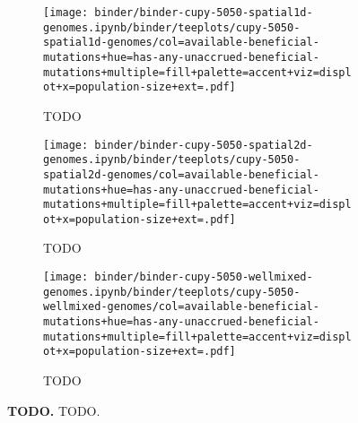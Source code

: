 \begin{figure}[h]
    \begin{subfigure}[b]{\linewidth}
        \begin{minipage}{\textwidth}
          \texttt{[image: binder/binder-cupy-5050-spatial1d-genomes.ipynb/binder/teeplots/cupy-5050-spatial1d-genomes/col=available-beneficial-mutations+hue=has-any-unaccrued-beneficial-mutations+multiple=fill+palette=accent+viz=displot+x=population-size+ext=.pdf]}%
        \end{minipage}
        \begin{minipage}{\textwidth}
        \caption{TODO}
        \label{fig:unaccrued-5050-cupy:spatial1d}
        \end{minipage}%
    \end{subfigure}

    \begin{subfigure}[b]{\linewidth}
        \begin{minipage}{\textwidth}
          \texttt{[image: binder/binder-cupy-5050-spatial2d-genomes.ipynb/binder/teeplots/cupy-5050-spatial2d-genomes/col=available-beneficial-mutations+hue=has-any-unaccrued-beneficial-mutations+multiple=fill+palette=accent+viz=displot+x=population-size+ext=.pdf]}%
        \end{minipage}
        \begin{minipage}{\textwidth}
        \caption{TODO}
        \label{fig:unaccrued-5050-cupy:spatial2d}
        \end{minipage}%
    \end{subfigure}%

\begin{subfigure}[b]{\linewidth}
    \begin{minipage}{\textwidth}
      \texttt{[image: binder/binder-cupy-5050-wellmixed-genomes.ipynb/binder/teeplots/cupy-5050-wellmixed-genomes/col=available-beneficial-mutations+hue=has-any-unaccrued-beneficial-mutations+multiple=fill+palette=accent+viz=displot+x=population-size+ext=.pdf]}%
    \end{minipage}
    \begin{minipage}{\textwidth}
    \caption{TODO}
    \label{fig:unaccrued-5050-cupy:wellmixed}
    \end{minipage}%
\end{subfigure}%


  \begin{minipage}{\textwidth}
    \caption{%
      \textbf{TODO.}
      \footnotesize
     TODO.
    }
    \label{fig:unaccrued-5050-cupy}
  \end{minipage}
\end{figure}
